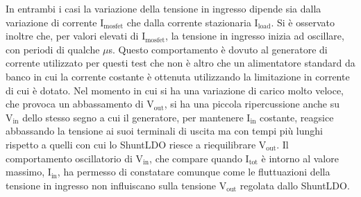 In entrambi i casi la variazione della tensione in ingresso dipende sia dalla variazione di corrente $\mathrm{I_{mosfet}}$ che dalla corrente stazionaria $\mathrm{I_{load}}$. 
Si è osservato inoltre che, per valori elevati di $\mathrm{I_{mosfet}}$, la tensione in ingresso inizia ad oscillare, con periodi di qualche $\mu$s.
Questo comportamento è dovuto al generatore di corrente utilizzato per questi test che non \`e altro che un alimentatore standard da banco in cui la corrente costante è ottenuta utilizzando la limitazione in corrente di cui \`e dotato. Nel momento in cui si ha una variazione di carico molto veloce, che provoca un abbassamento di $\mathrm{V_{out}}$, si ha una piccola ripercussione anche su $\mathrm{V_{in}}$ dello stesso segno a cui il generatore, per mantenere $\mathrm{I_{in}}$ costante, reagsice abbassando la tensione ai suoi terminali di uscita ma con tempi più lunghi rispetto a quelli con cui lo ShuntLDO riesce a riequilibrare $\mathrm{V_{out}}$.
Il comportamento oscillatorio di $\mathrm{V_{in}}$, che compare quando $\mathrm{I_{tot}}$ è intorno al valore massimo, $\mathrm{I_{in}}$, ha permesso di constatare comunque come le fluttuazioni della tensione in ingresso non influiscano sulla tensione $\mathrm{V_{out}}$ regolata dallo ShuntLDO.

